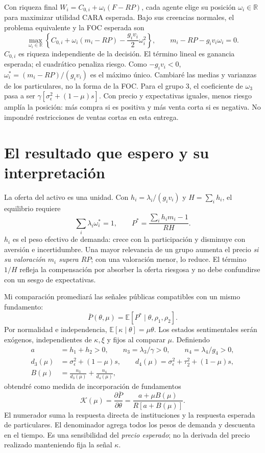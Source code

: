 \documentclass[11pt]{article}
\newcommand{\E}{\mathbb E}
\begin{document}
Con riqueza final $W_i=C_{0,i}+\omega_i(F-RP)$, cada agente elige
su posición $\omega_i\in\mathbb R$ para maximizar utilidad CARA esperada.
Bajo sus creencias normales, el problema equivalente y la FOC esperada son
\begin{equation}\label{eq:foc}
 \max_{\omega_i\in\mathbb R}
 \left\{C_{0,i}+\omega_i(m_i-RP)-\frac{g_iv_i}{2}\omega_i^2\right\},
 \qquad m_i-RP-g_iv_i\omega_i=0.
\end{equation}
$C_{0,i}$ es riqueza independiente de la decisión. El término lineal es
ganancia esperada; el cuadrático penaliza riesgo. Como $-g_iv_i<0$,
$\omega_i^*=(m_i-RP)/(g_iv_i)$ es el máximo único. Cambiaré las medias y
varianzas de los particulares, no la forma de la FOC. Para el grupo 3, el
coeficiente de $\omega_3$ pasa a ser
$\gamma[\sigma_\epsilon^2+(1-\mu)s]$. Con precio y expectativas iguales,
menos riesgo amplía la posición: más compra si es positiva y más venta corta
si es negativa. No impondré restricciones de ventas cortas en esta entrega.

\newpage
\section{El resultado que espero y su interpretación}
La oferta del activo es una unidad. Con
$h_i=\lambda_i/(g_iv_i)$ y $H=\sum_i h_i$, el equilibrio requiere
\begin{equation}\label{eq:price}
 \sum_i\lambda_i\omega_i^*=1,
 \qquad P^*=\frac{\sum_i h_im_i-1}{RH}.
\end{equation}
$h_i$ es el peso efectivo de demanda: crece con la participación y disminuye
con aversión e incertidumbre. Una mayor relevancia de un grupo aumenta el
precio \emph{si su valoración $m_i$ supera $RP$}; con una valoración menor,
lo reduce. El término $1/H$ refleja la compensación por absorber la oferta
riesgosa y no debe confundirse con un sesgo de expectativas.

Mi comparación promediará las señales públicas compatibles con un mismo
fundamento:
\[
 \bar P(\theta,\mu)=\E[P^*\mid\theta,\rho_1,\rho_2].
\]
Por normalidad e independencia, $\E[\kappa\mid\theta]=\mu\theta$.
Los estados sentimentales serán exógenos, independientes de $\kappa,\xi$
y fijos al comparar $\mu$. Definiendo
\begin{align*}
 a&=h_1+h_2>0,\qquad n_3=\lambda_3/\gamma>0,\qquad n_4=\lambda_4/g_4>0,\\
 d_3(\mu)&=\sigma_\epsilon^2+(1-\mu)s,\qquad
 d_4(\mu)=\sigma_\epsilon^2+\tau_2^2+(1-\mu)s,\\
 B(\mu)&=\frac{n_3}{d_3(\mu)}+\frac{n_4}{d_4(\mu)},
\end{align*}
obtendré como medida de incorporación de fundamentos
\begin{equation}\label{eq:K}
 \mathcal K(\mu)=\frac{\partial\bar P}{\partial\theta}
       =\frac{a+\mu B(\mu)}{R[a+B(\mu)]}.
\end{equation}
El numerador suma la respuesta directa de instituciones y la respuesta
esperada de particulares. El denominador agrega todos los pesos de demanda
y descuenta en el tiempo. Es una sensibilidad del \emph{precio esperado};
no la derivada del precio realizado manteniendo fija la señal $\kappa$.
\end{document}
